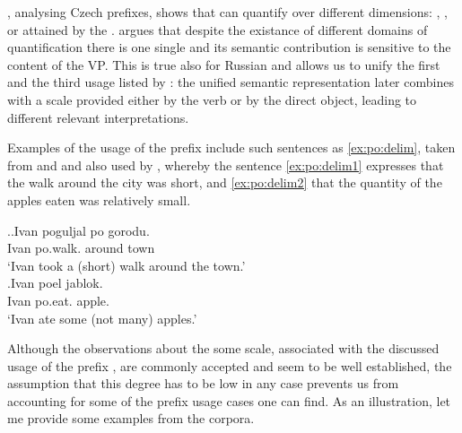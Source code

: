 \citet{Souchkova:04}, analysing Czech prefixes, shows that  can quantify over different dimensions: , , or  attained by the . \citeauthor{Souchkova:04} argues that despite the existance of different domains of quantification there is one single   and its semantic contribution is sensitive to the content of the VP. This is true also for Russian and allows us to unify the first and the third usage listed by \citet{Shvedova:82}: the unified semantic representation later combines with a scale provided either by the verb or by the direct object, leading to different relevant interpretations.

Examples of the  usage of the prefix  include such sentences as \ref{ex:po:delim}, taken from \citet{Filip:00} and \citet{Souchkova:04} and also used by \citet{Kagan:book}, whereby the sentence \ref{ex:po:delim1} expresses that the walk around the city was short, and \ref{ex:po:delim2} that the quantity of the apples eaten was relatively small.

\ex.\label{ex:po:delim}\ag.\label{ex:po:delim1}Ivan poguljal po gorodu.\\
Ivan po.walk. around town\\
\trans `Ivan took a (short) walk around the town.'\\
\bg.\label{ex:po:delim2}Ivan poel jablok.\\
Ivan po.eat. apple.\\
\trans `Ivan ate some (not many) apples.'


Although the observations about the  some scale, associated with the discussed usage of the prefix , are commonly accepted and seem to be well established, the assumption that this degree has to be low in any case prevents us from accounting for some of the prefix usage cases one can find. As an illustration, let me provide some examples from the corpora.

